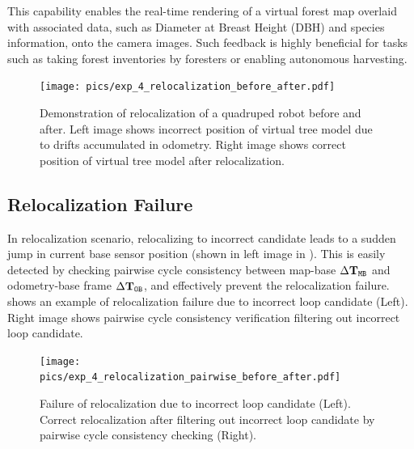 This capability enables the real-time rendering of a virtual forest map overlaid with associated data, such as Diameter at Breast Height (DBH) and species information, onto the camera images. Such feedback is highly beneficial for tasks such as taking forest inventories by foresters or enabling autonomous harvesting.
\begin{figure}[htbp]
  \centering
  \texttt{[image: pics/exp\_4\_relocalization\_before\_after.pdf]}
  \caption{Demonstration of relocalization of a quadruped robot before and after. Left image shows incorrect position of virtual tree model due to drifts accumulated in odometry. Right image shows correct position of virtual tree model after relocalization.}
  \label{fig:relocalization_before_after}
\end{figure}

\subsection*{Relocalization Failure}
In relocalization scenario, relocalizing to incorrect candidate leads to a sudden jump in current base sensor position (shown in left image in ). This is easily detected by checking pairwise cycle consistency between map-base $\Delta\mathbf{T}_{\mathtt{M}\mathtt{B}}$ and odometry-base frame $\Delta\mathbf{T}_{\mathtt{O}\mathtt{B}}$, and effectively prevent the relocalization failure.  shows an example of relocalization failure due to incorrect loop candidate (Left). Right image shows pairwise cycle consistency verification filtering out incorrect loop candidate.
\begin{figure}[htbp]
  \centering
  \texttt{[image: pics/exp\_4\_relocalization\_pairwise\_before\_after.pdf]}
  \caption{Failure of relocalization due to incorrect loop candidate (Left). Correct relocalization after filtering out incorrect loop candidate by pairwise cycle consistency checking (Right).}
  \label{fig:relocalization_pairwise_cycle_consistency}
\end{figure}


